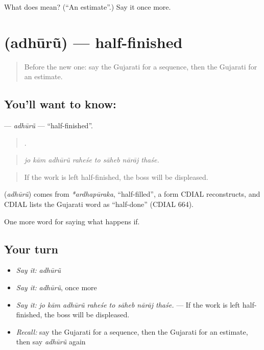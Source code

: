\begin{tcolorbox}[breakable,colback=teal!4,colframe=teal!35!black,title={Before you move on}]
What does  mean? (\textquotedblleft{}An estimate\textquotedblright{}.) Say it once more.
\end{tcolorbox}
\section[\texorpdfstring{\gu{અધૂરું} (adhūrũ)}{અધૂરું (adhūrũ)}]{ (adhūrũ) — half-finished}

\label{lesson:GU-C529-adhuru}



\begin{quote}
Before the new one: say the Gujarati for a sequence, then the Gujarati for an estimate.
\end{quote}

\subsection*{You'll want to know: }
\textbf{} — \emph{adhūrũ} — \textquotedblleft{}half-finished\textquotedblright{}.

\begin{quote}
       .
\end{quote}

\begin{quote}
\emph{jo kām adhūrũ raheśe to sāheb nārāj thaśe.}
\end{quote}

\begin{quote}
If the work is left half-finished, the boss will be displeased.
\end{quote}

\begin{cousinweb}
\textbf{} (\emph{adhūrũ}) comes from \emph{*ardhapūraka}, \textquotedblleft{}half-filled\textquotedblright{}, a form CDIAL reconstructs, and CDIAL lists the Gujarati word as \textquotedblleft{}half-done\textquotedblright{} (CDIAL 664).
\end{cousinweb}

\begin{grammarlens}[title={What you've built}]
One more word for saying what happens if.
\end{grammarlens}

\subsection*{Your turn}
\begin{itemize}
\raggedright
  \item \emph{Say it:} \emph{adhūrũ}
  \item \emph{Say it:} \emph{adhūrũ}, once more
  \item \emph{Say it:} \emph{jo kām adhūrũ raheśe to sāheb nārāj thaśe.} — If the work is left half-finished, the boss will be displeased.
  \item \emph{Recall:} say the Gujarati for a sequence, then the Gujarati for an estimate, then say \emph{adhūrũ} again
\end{itemize}

